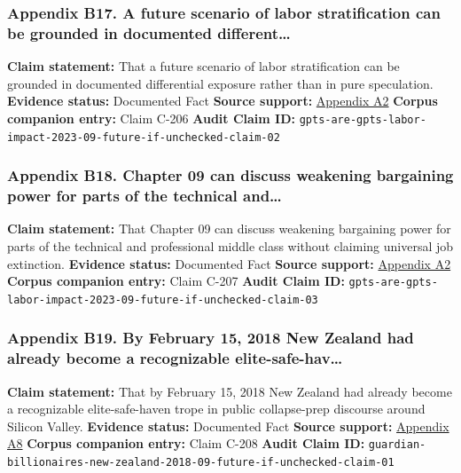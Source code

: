 \documentclass[
  american,
  11pt,
  letterpaper,
]{article}
\begin{document}
\subsubsection{Appendix B17. A future scenario of labor stratification
can be grounded in documented
different\ldots{}}\label{appendix-b17-a-future-scenario-of-labor-stratification-can-be-grounded-in-documented-different}

\textbf{Claim statement:} That a future scenario of labor stratification
can be grounded in documented differential exposure rather than in pure
speculation. \textbf{Evidence status:} Documented Fact \textbf{Source
support:}
\hyperref[appendix-a2-gpts-are-gpts-an-early-look-at-the-labor-market-impact-potential-of-large-language-models]{Appendix
A2} \textbf{Corpus companion entry:} Claim C-206 \textbf{Audit Claim
ID:}
\texttt{gpts-are-gpts-labor-impact-2023-09-future-if-unchecked-claim-02}

\subsubsection{Appendix B18. Chapter 09 can discuss weakening bargaining
power for parts of the technical
and\ldots{}}\label{appendix-b18-chapter-09-can-discuss-weakening-bargaining-power-for-parts-of-the-technical-and}

\textbf{Claim statement:} That Chapter 09 can discuss weakening
bargaining power for parts of the technical and professional middle
class without claiming universal job extinction. \textbf{Evidence
status:} Documented Fact \textbf{Source support:}
\hyperref[appendix-a2-gpts-are-gpts-an-early-look-at-the-labor-market-impact-potential-of-large-language-models]{Appendix
A2} \textbf{Corpus companion entry:} Claim C-207 \textbf{Audit Claim
ID:}
\texttt{gpts-are-gpts-labor-impact-2023-09-future-if-unchecked-claim-03}

\subsubsection{Appendix B19. By February 15, 2018 New Zealand had
already become a recognizable
elite-safe-hav\ldots{}}\label{appendix-b19-by-february-15-2018-new-zealand-had-already-become-a-recognizable-elite-safe-hav}

\textbf{Claim statement:} That by February 15, 2018 New Zealand had
already become a recognizable elite-safe-haven trope in public
collapse-prep discourse around Silicon Valley. \textbf{Evidence status:}
Documented Fact \textbf{Source support:}
\hyperref[appendix-a8-why-silicon-valley-billionaires-are-prepping-for-the-apocalypse-in-new-zealand]{Appendix
A8} \textbf{Corpus companion entry:} Claim C-208 \textbf{Audit Claim
ID:}
\texttt{guardian-billionaires-new-zealand-2018-09-future-if-unchecked-claim-01}
\end{document}
